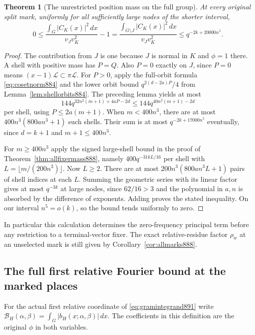\documentclass[a4paper,11pt]{article}
\newtheorem{theorem}[proposition]{Theorem}
\theoremstyle{definition}
\theoremstyle{remark}
\numberwithin{equation}{section}
\begin{document}
\begin{theorem}[The unrestricted position mass on the full group]
\leavevmode\label{thm:allkmass897}
At every original split mark, uniformly for all sufficiently
large nodes of the shorter interval,
\[
 0\le\frac{\int_G|C_K(x)|^2\,dx}{v_Jv_K^2}-1
          =\frac{\int_{G\setminus J}|C_K(x)|^2\,dx}{v_Jv_K^2}
          \le q^{-2k+20000n^5}.
\]
\end{theorem}
\begin{proof}
The contribution from \(J\) is one because \(J\) is normal in
\(K\) and \(\phi=1\) there. A shell with positive mass has \(P=Q\).
Also \(P=0\) exactly on \(J\), since \(P=0\) means
\((x-1)\mathcal L\subset\pi\mathcal L\).
For \(P>0\), apply the full-orbit formula
\eqref{eq:cosetnorm884} and the lower orbit bound
\(q^{2(d-2a)P}/4\) from Lemma~\ref{lem:shellorbits884}.
The preceding lemma yields at most
\[
       144q^{32n^2(m+1)+4aP-2d}
           \le 144q^{40n^2(m+1)-2d}
\]
per shell, using \(P\le2a(m+1)\). When \(m<400n^3\), there
are at most \(400n^3(800an^3+1)\) such shells. Their sum is
at most \(q^{-2k+17000n^5}\) eventually, since \(d=k+1\)
and \(m+1\le400n^3\).

For \(m\ge400n^3\) apply the signed large-shell bound in the
proof of Theorem~\ref{thm:allfixermass888}, namely
\(400q^{-31kL/16}\) per shell with
\(L=\lfloor m/(200n^3)\rfloor\). Now \(L\ge2\). There are at most
\(200n^3(800an^3L+1)\) pairs of shell indices at each \(L\).
Summing the geometric series with its linear factor gives at
most \(q^{-3k}\) at large nodes, since \(62/16>3\) and the
polynomial in \(a,n\) is absorbed by the difference of exponents.
Adding proves the stated inequality. On our interval
\(n^5=o(k)\), so the bound tends uniformly to zero.
\end{proof}

In particular this calculation determines the zero-frequency
principal term before any restriction to a terminal-vector fixer.
The exact relative-residue factor \(\rho_w\) at an unselected
mark is still given by Corollary~\ref{cor:allmarks888}.
\clearpage

\subsection{The full first relative Fourier bound at the marked places}
\label{sec:fullfirst898}

For the actual first relative coordinate of
\eqref{eq:gramintegrand891} write
\(\mathcal B_H(\alpha,\beta)=\int_G|b_H(x;\alpha,\beta)|\,dx\).
The coefficients in this definition are the original \(\phi\) in
both variables.
\end{document}
